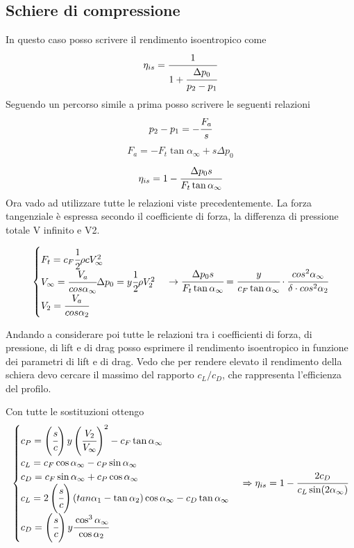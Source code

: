 \subsection{Schiere di compressione}
In questo caso posso scrivere il rendimento isoentropico come
\begin{align*}
\eta_{is} = \cfrac{1}{1 + \cfrac{\Delta p_0}{p_2-p_1}}
\end{align*}
Seguendo un percorso simile a prima posso scrivere le seguenti relazioni
\begin{align*}
p_2-p_1 = -\cfrac{F_a}{s}
\end{align*}
\begin{align*}
F_a = -F_t \tan \alpha_{\infty} + s \Delta p_0
\end{align*}
\begin{align*}
\eta_{is} = 1- \cfrac{\Delta p_0 s}{F_t \tan \alpha_{\infty}}
\end{align*}
Ora vado ad utilizzare tutte le relazioni viste precedentemente. 
La forza tangenziale è espressa secondo il coefficiente di forza, la differenza di pressione totale V infinito e V2. 

\begin{align*}
\begin{cases}
F_t = c_F \cfrac{1}{2} \rho c V_{\infty}^2\\
V_{\infty} = \cfrac{V_a}{cos \alpha_{\infty}}
\Delta p_0 = y \cfrac{1}{2} \rho V_2^2\\
V_2 = \cfrac{V_a}{cos \alpha_2}
\end{cases}
\rightarrow
\cfrac{\Delta p_0 s}{F_t \tan \alpha_{\infty}} = \cfrac{y}{c_F \tan \alpha_{\infty}} \cdot \cfrac{cos^2 \alpha_{\infty}}{\delta \cdot cos^2 \alpha_2}
\end{align*}


Andando a considerare poi tutte le relazioni tra i coefficienti di forza, di pressione, di lift e di drag posso esprimere il rendimento isoentropico in funzione dei parametri di lift e di drag.
Vedo che per rendere elevato il rendimento della schiera devo cercare il massimo del rapporto $c_L/c_D$, che rappresenta l'efficienza del profilo.

Con tutte le sostituzioni ottengo
\begin{align*}
\begin{cases}
c_P = \left(  \cfrac{s}{c} \right) y \left( \cfrac{V_2}{V_{\infty}}  \right)^2 - c_F \tan \alpha_{\infty}\\
c_L = c_F \cos \alpha_{\infty} - c_P \sin \alpha_{\infty}\\
c_D = c_F \sin \alpha_{\infty} + c_P \cos \alpha_{\infty}\\
c_L = 2 \left(  \cfrac{s}{c} \right) (tan \alpha_1 - \tan \alpha_2) \cos \alpha_{\infty} - c_D \tan \alpha_{\infty}\\
c_D= \left(  \cfrac{s}{c} \right) y \cfrac{\cos^3 \alpha_{\infty}}{\cos \alpha_2}
\end{cases}
\Rightarrow
\eta_{is} = 1- \cfrac{2 c_D}{c_L \sin (2 \alpha_{\infty})}
\end{align*}

